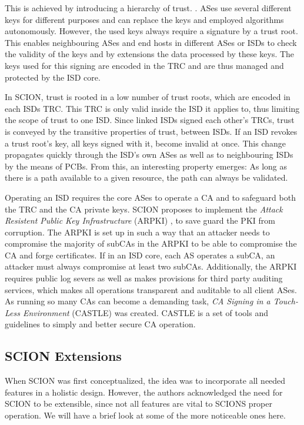 \documentclass[../eva1_scion.tex]{subfiles}
\begin{document}
    This is achieved by introducing a hierarchy of trust. \cite{scion_2011}. ASes use several different keys for different purposes and can replace the keys and employed algorithms autonomously. However, the used keys always require a signature by a trust root. This enables neighbouring ASes and end hosts in different ASes or ISDs to check the validity of the keys and by extensions the data processed by these keys. The keys used for this signing are encoded in the TRC and are thus managed and protected by the ISD core.

    In SCION, trust is rooted in a low number of trust roots, which are encoded in each ISDs TRC. This TRC is only valid inside the ISD it applies to, thus limiting the scope of trust to one ISD. Since linked ISDs signed each other's TRCs, trust is conveyed by the transitive properties of trust, between ISDs. If an ISD revokes a trust root's key, all keys signed with it, become invalid at once. This change propagates quickly through the ISD's own ASes as well as to neighbouring ISDs by the means of PCBs. From this, an interesting property emerges: As long as there is a path available to a given resource, the path can always be validated.

    Operating an ISD requires the core ASes to operate a CA and to safeguard both the TRC and the CA private keys. SCION proposes to implement the \textit{Attack Resistent Public Key Infrastructure} (ARPKI) \cite{arpki_2018}, to save guard the PKI from corruption. The ARPKI is set up in such a way that an attacker needs to compromise the majority of subCAs in the ARPKI to be able to compromise the CA and forge certificates. If in an ISD core, each AS operates a subCA, an attacker must always compromise at least two subCAs. Additionally, the ARPKI requires public log severs as well as makes provisions for third party auditing services, which makes all operations transparent and auditable to all client ASes. As running so many CAs can become a demanding task, \textit{CA Signing in a Touch-Less Environment} (CASTLE) \cite{castle_2016} was created. CASTLE is a set of tools and guidelines to simply and better secure CA operation.

    \subsection{SCION Extensions}
    When SCION was first conceptualized, the idea was to incorporate all needed features in a holistic design. However, the authors acknowledged the need for SCION to be extensible, since not all features are vital to SCIONS proper operation. We will have a brief look at some of the more noticeable ones here.
\end{document}
